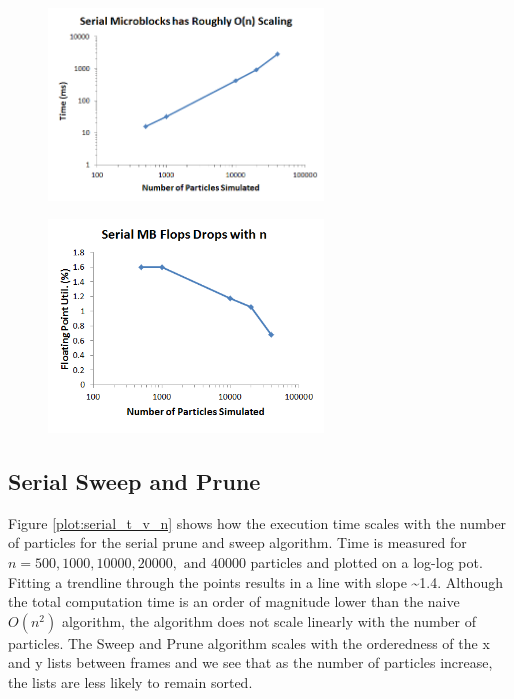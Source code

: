 \documentclass[11pt]{article} %
\begin{document}
\begin{figure}[!h]
\centering
\includegraphics[width=0.65\textwidth]{figures/serial_mb_n.png}
\caption{}
\label{serial_mb_n}
\end{figure}

\begin{figure}[!h]
\centering
\includegraphics[width=0.65\textwidth]{figures/serial_mb_flops.png}
\caption{}
\label{serial_mb_flops}
\end{figure}

\subsection{Serial Sweep and Prune}

Figure \ref{plot:serial_t_v_n} shows how the execution time scales
with the number of particles for the serial prune and sweep algorithm.
Time is measured for $n=500,1000,10000,20000,\text{ and }40000$ particles
and plotted on a log-log pot. Fitting a trendline through the points
results in a line with slope \textasciitilde{}1.4. Although the total
computation time is an order of magnitude lower than the naive $O(n^{2})$
algorithm, the algorithm does not scale linearly with the number of
particles. The Sweep and Prune algorithm scales with the orderedness
of the x and y lists between frames and we see that as the number
of particles increase, the lists are less likely to remain sorted. 
\end{document}
